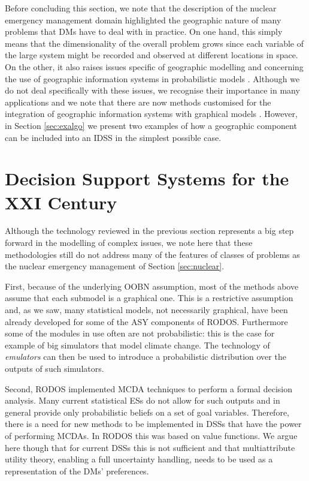 Before concluding this section, we note that the description of the nuclear emergency management domain highlighted the geographic nature of many problems that DMs have to deal with in practice. On one hand, this simply means that the dimensionality of the overall problem grows since each variable of the large system might be recorded and observed at different locations in space. On the other, it also raises issues specific of geographic modelling and concerning the use of geographic information systems in probabilistic models \citep{Stassopoulou1998}. Although we do not deal specifically with these issues, we recognise their importance in many applications and we note that there are now methods customised for the integration of geographic information systems with graphical models \citep{Laskey2010, Johnson2012}. However, in Section \ref{sec:exalgo} we present two examples of how a geographic component can be included into an IDSS in the simplest possible case.

\section{Decision Support Systems for the XXI Century}
\label{sec:decision}
Although the technology  reviewed in the previous section represents a big step forward in the modelling of complex issues, we note here that these methodologies still do not address many of the features of classes of problems as the nuclear emergency management of Section \ref{sec:nuclear}. 

First, because of the underlying OOBN assumption, most of the methods above assume that each submodel is a graphical one. This is a restrictive assumption and, as we saw, many statistical models, not necessarily graphical, have been already developed for some of the ASY components of RODOS. Furthermore some of the modules in use often are not probabilistic: this is the case for example of big simulators that model climate change. The technology of \textit{emulators} \citep[][and Section \ref{sec:emu}]{Kennedy2001, OHagan2006} can then be used  to introduce a probabilistic distribution over the outputs of such simulators. 

Second, RODOS implemented MCDA techniques to perform a formal decision analysis. Many current statistical ESs do not allow for such outputs and in general provide only probabilistic beliefs on a set of goal variables. Therefore, there is a need for new methods to be implemented in DSSs that have the power of performing MCDAs. In RODOS this was based on value functions. We argue here though that for current DSSs this is not sufficient and that multiattribute utility theory, enabling a full uncertainty handling, needs to be used as a representation of the DMs' preferences.      

